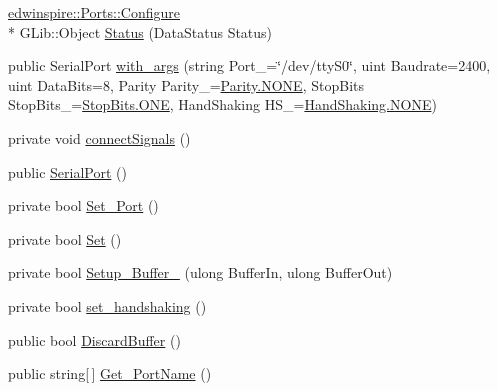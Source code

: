 \begin{DoxyCompactItemize}
\item 
\hyperlink{classedwinspire_1_1_ports_1_1_configure}{edwinspire\-::\-Ports\-::\-Configure} \\*
G\-Lib\-::\-Object \hyperlink{namespaceedwinspire_1_1_ports_aa3f7c9d23312aa446f2b0b8f52efdf34}{Status} (Data\-Status Status)
\item 
public Serial\-Port \hyperlink{namespaceedwinspire_1_1_ports_a9de2452f18841a5338e2c45fbc8cca2d}{with\-\_\-args} (string Port\-\_\-=\char`\"{}/dev/tty\-S0\char`\"{}, uint Baudrate=2400, uint Data\-Bits=8, Parity Parity\-\_\-=\hyperlink{libspire__serial_8vala_a899caa602e4fff675b17cdbab33607ec}{Parity.\-N\-O\-N\-E}, Stop\-Bits Stop\-Bits\-\_\-=\hyperlink{libspire__serial_8vala_a2cb8470634cc90a55800ee95f967eade}{Stop\-Bits.\-O\-N\-E}, Hand\-Shaking H\-S\-\_\-=\hyperlink{libspire__serial_8vala_a899caa602e4fff675b17cdbab33607ec}{Hand\-Shaking.\-N\-O\-N\-E})
\item 
private void \hyperlink{namespaceedwinspire_1_1_ports_af8d9afe49636a2f0ba22f1f17bbaba17}{connect\-Signals} ()
\item 
public \hyperlink{namespaceedwinspire_1_1_ports_a293ef58b4105463e6bd4b2d5ad9b3144}{Serial\-Port} ()
\item 
private bool \hyperlink{namespaceedwinspire_1_1_ports_a17877b618445a0e65f46c94bc80bc821}{Set\-\_\-\-Port} ()
\item 
private bool \hyperlink{namespaceedwinspire_1_1_ports_ab4f5440159397421d6f1985dccda8aa7}{Set} ()
\item 
private bool \hyperlink{namespaceedwinspire_1_1_ports_a7a08c939ddf6ae7e1426b3bd061c3f13}{Setup\-\_\-\-Buffer\-\_\-} (ulong Buffer\-In, ulong Buffer\-Out)
\item 
private bool \hyperlink{namespaceedwinspire_1_1_ports_a16c386569d50ef1f47b43bce24c54cde}{set\-\_\-handshaking} ()
\item 
public bool \hyperlink{namespaceedwinspire_1_1_ports_ae3a4888c33e46ef2cb9c21475b39747d}{Discard\-Buffer} ()
\item 
public string\mbox{[}$\,$\mbox{]} \hyperlink{namespaceedwinspire_1_1_ports_ab6cd9fa85820a8013aa6f47c89eb8102}{Get\-\_\-\-Port\-Name} ()
\end{DoxyCompactItemize}
